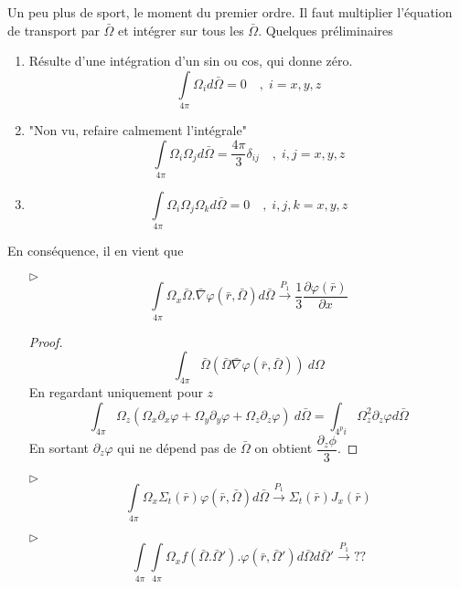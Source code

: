 Un peu plus de sport, le moment du premier ordre. Il faut multiplier l'équation de transport 
par $\bar\Omega$ et intégrer sur tous les $\bar\Omega$. Quelques préliminaires 
\begin{enumerate}
\item Résulte d'une intégration d'un sin ou cos, qui donne zéro.
\begin{equation}
\int\limits_{4\pi }   {\Omega _i}d\bar \Omega  = 0\quad ,\;i = x,y,z
\end{equation}
\item "Non vu, refaire calmement l'intégrale"
\begin{equation}
\int\limits_{4\pi }    {\Omega _i}{\Omega _j}d\bar \Omega  = \frac{{4\pi }}{3}{\delta _{ij}}\quad ,\;i,j = x,y,z
\end{equation}
\item\begin{equation}
\int\limits_{4\pi }    {\Omega _i}{\Omega _j}{\Omega _k}d\bar \Omega  = 0\quad ,\;i,j,k = x,y,z
\end{equation}
\end{enumerate}
En conséquence, il en vient que 
\begin{itemize}
\item[$\triangleright$]
\begin{equation}
\int\limits_{4\pi }   {\Omega _x}\bar \Omega .\bar \nabla \varphi (\bar r,\bar \Omega )d\bar \Omega\overset{P_1}{\longrightarrow} \frac{1}{3}\frac{{\partial \varphi (\bar r)}}{{\partial x}}
\end{equation}
\begin{proof}
\begin{equation}
\int_{4\pi} \bar{\Omega}(\bar{\Omega}\bar\nabla\varphi(\bar r,\bar\Omega))\ d\Omega
\end{equation}
En regardant uniquement pour $z$
\begin{equation}
\int_{4\pi} \Omega_z(\Omega_x\partial_x\varphi +\Omega_y\partial_y\varphi+\Omega_z\partial_z\varphi)\ d\bar\Omega =\int_{4^pi} \Omega_z^2 \partial_z\varphi d\bar{\Omega}
\end{equation}
En sortant $\partial_z\varphi$ qui ne dépend pas de $\bar\Omega$ on obtient $\dfrac{\partial_z\phi}{3}$.
\end{proof}

\item[$\triangleright$]
\begin{equation}
\int\limits_{4\pi }    {\Omega _x}{\Sigma _t}(\bar r)\varphi (\bar r,\bar \Omega )d\bar \Omega\overset{P_1}{\longrightarrow} {\Sigma _t}(\bar r){J_x}(\bar r)
\end{equation}
\item[$\triangleright$]
\begin{equation}
\int\limits_{4\pi }    \int\limits_{4\pi }    {\Omega _x}f(\bar \Omega .\bar \Omega ').\varphi (\bar r,\bar \Omega ')d\bar \Omega d\bar \Omega ' \overset{P_1}{\longrightarrow} ??
\end{equation}
\end{itemize}
